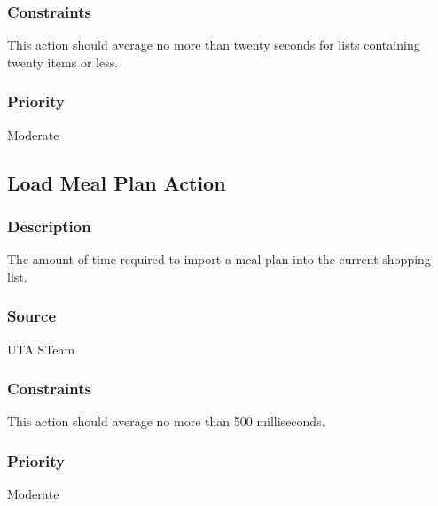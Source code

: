 \subsubsection{Constraints}
This action should average no more than twenty seconds for lists containing twenty items or less.
\subsubsection{Priority}
Moderate

\subsection{Load Meal Plan Action}
\subsubsection{Description}
The amount of time required to import a meal plan into the current shopping list.
\subsubsection{Source}
UTA STeam
\subsubsection{Constraints}
This action should average no more than 500 milliseconds.
\subsubsection{Priority}
Moderate